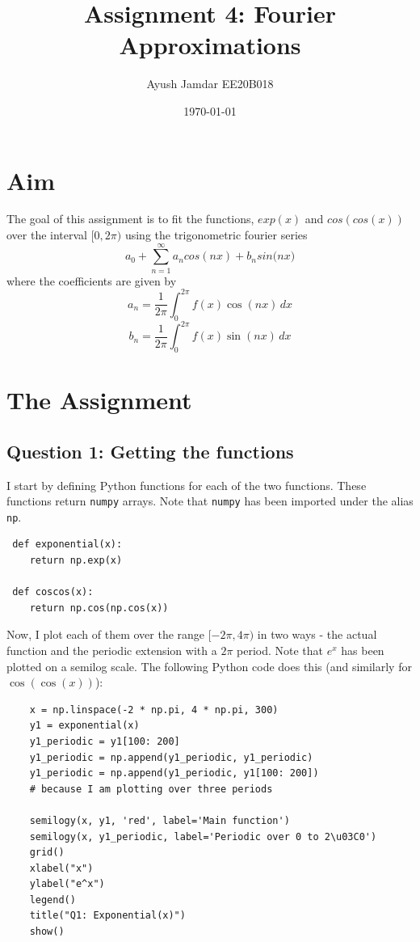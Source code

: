 \documentclass[11pt, a4paper]{article}
\title{Assignment 4: Fourier Approximations} %
\author{Ayush Jamdar EE20B018} %
\date{\today} %
\begin{document}
		
		
\maketitle %
\section{Aim}
The goal of this assignment is to fit the functions, $exp(x)$ and $cos(cos(x))$ over the interval $[0, 2\pi)$ using the trigonometric fourier series
$$a_{0}+\sum_{n=1}^{\infty}{a_{n}cos(nx)+b_{n}sin(nx})$$
where the coefficients are given by
\[a_{n}=\frac{1}{2\pi}\int_{0}^{2\pi} f(x)\cos(nx) \,dx \]
\[b_{n}=\frac{1}{2\pi}\int_{0}^{2\pi} f(x)\sin(nx) \,dx \]


\section{The Assignment}

 \subsection{Question 1: Getting the functions}
 I start by defining Python functions for each of the two functions. These functions return \texttt{numpy} arrays. Note that \texttt{numpy} has been imported under the alias \texttt{np}.
 \begin{verbatim}
 def exponential(x):
    return np.exp(x)

 def coscos(x):
    return np.cos(np.cos(x))
 \end{verbatim}
 Now, I plot each of them over the range $[-2\pi, 4\pi)$ in two ways - the actual function and the periodic extension with a $2\pi$ period. Note that $e^x$ has been plotted on a semilog scale. The following Python code does this (and similarly for $\cos(\cos(x))$):
 	\begin{verbatim}
 	x = np.linspace(-2 * np.pi, 4 * np.pi, 300)
	y1 = exponential(x)
	y1_periodic = y1[100: 200]
	y1_periodic = np.append(y1_periodic, y1_periodic)
	y1_periodic = np.append(y1_periodic, y1[100: 200])  
	# because I am plotting over three periods
	
	semilogy(x, y1, 'red', label='Main function')
	semilogy(x, y1_periodic, label='Periodic over 0 to 2\u03C0')
	grid()
	xlabel("x")
	ylabel("e^x")
	legend()
	title("Q1: Exponential(x)")
	show()
 	\end{verbatim}
 
\end{document}
